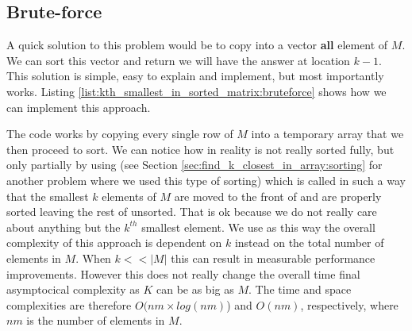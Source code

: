 \subsection{Brute-force}
\label{kth_smallest_in_sorted_matrix:sec:bruteforce}
A quick solution to this problem would be to copy into a vector \textbf{all} element of $M$. We can sort this vector and return we will have the answer at location  $k-1$. 
This solution is simple, easy to explain and implement, but most importantly works. Listing \ref{list:kth_smallest_in_sorted_matrix:bruteforce} shows how we can implement this approach.



The code works by copying every single row of $M$ into a temporary array  that we then proceed to sort. We can notice how in reality  is not really sorted fully, but only partially by using \cite{cit::std::partialsort} (see Section \ref{sec:find_k_closest_in_array:sorting} for another problem where we used this type of sorting) which is called in such a way that the smallest $k$ elements of $M$ are moved to the front of  and are properly sorted leaving the rest of  unsorted. That is ok because we do not really care about anything but the $k^{th}$ smallest element. We use  as this way the overall complexity of this approach is dependent on $k$ instead on the total number of elements in $M$. When $k << |M|$ this can result in measurable performance improvements. However this does not really change the overall time final asymptocical complexity as $K$ can be as big as $M$.
The time and space complexities are therefore $O(nm\times log(nm)$) and $O(nm)$, respectively, where $nm$ is the number of elements in $M$.

